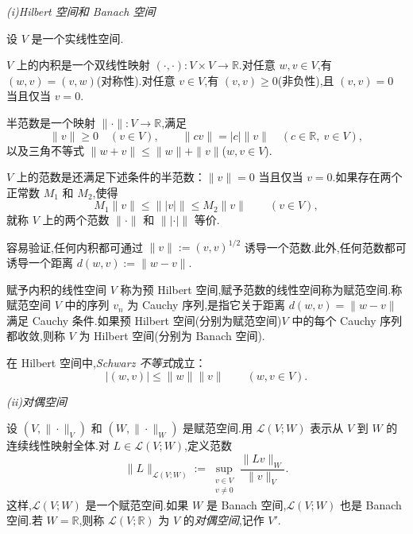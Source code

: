 \medskip
\noindent\textit{(i)Hilbert 空间和 Banach 空间}

设 \(V\) 是一个实线性空间.
\begin{definition*}[内积]
\(V\) 上的{\heiti 内积}是一个双线性映射 \((\cdot,\cdot)\colon V\times V\to\mathbb R\).对任意 \(w,v\in V\),有 \((w,v)=(v,w)\)(对称性).对任意 \(v\in V\),有 \((v,v)\ge 0\)(非负性),且 \((v,v)=0\) 当且仅当 \(v=0\).
\end{definition*}

\begin{definition*}[半范数与范数]
{\heiti 半范数}是一个映射 \(\|\cdot\|\colon V\to\mathbb R\),满足
\[
  \|v\|\ge 0\quad(v\in V),\qquad
  \|cv\|=|c|\|v\|\quad(c\in\mathbb R,\ v\in V),
\]
以及三角不等式 \(\|w+v\|\le\|w\|+\|v\|\)(\(w,v\in V\)).

\(V\) 上的{\heiti 范数}是还满足下述条件的半范数：\(\|v\|=0\) 当且仅当 \(v=0\).如果存在两个正常数 \(M_1\) 和 \(M_2\),使得
\[
  M_1\|v\|\le \lVert\!\lvert v\rvert\!\rVert\le M_2\|v\|
  \qquad (v\in V),
\]
就称 \(V\) 上的两个范数 \(\|\cdot\|\) 和 \(\lVert\!\lvert\cdot\rvert\!\rVert\) 等价.
\end{definition*}

容易验证,任何内积都可通过 \(\|v\|:=(v,v)^{1/2}\) 诱导一个范数.此外,任何范数都可诱导一个距离 \(d(w,v):=\|w-v\|\).

\begin{definition*}
赋予内积的线性空间 \(V\) 称为预 Hilbert 空间,赋予范数的线性空间称为赋范空间.称赋范空间 \(V\) 中的序列 \(v_n\) 为 Cauchy 序列,是指它关于距离 \(d(w,v)=\|w-v\|\) 满足 Cauchy 条件.如果预 Hilbert 空间(分别为赋范空间)\(V\) 中的每个 Cauchy 序列都收敛,则称 \(V\) 为 {\heiti Hilbert 空间}(分别为 {\heiti Banach 空间}).
\end{definition*}

在 Hilbert 空间中,\emph{Schwarz 不等式}成立：
\begin{equation}\label{eq:1.2.1}
  |(w,v)|\le\|w\|\|v\| \qquad (w,v\in V).
\end{equation}

\medskip
\noindent\textit{(ii)对偶空间}

设 \((V,\|\cdot\|_V)\) 和 \((W,\|\cdot\|_W)\) 是赋范空间.用 \(\mathcal L(V;W)\) 表示从 \(V\) 到 \(W\) 的连续线性映射全体.对 \(L\in\mathcal L(V;W)\),定义范数
\begin{equation}\label{eq:1.2.2}
  \|L\|_{\mathcal L(V;W)}:=
  \sup_{\substack{v\in V\\v\ne 0}}\frac{\|Lv\|_W}{\|v\|_V}.
\end{equation}
这样,\(\mathcal L(V;W)\) 是一个赋范空间.如果 \(W\) 是 Banach 空间,\(\mathcal L(V;W)\) 也是 Banach 空间.若 \(W=\mathbb R\),则称 \(\mathcal L(V;\mathbb R)\) 为 \(V\) 的\emph{对偶空间},记作 \(V'\).


